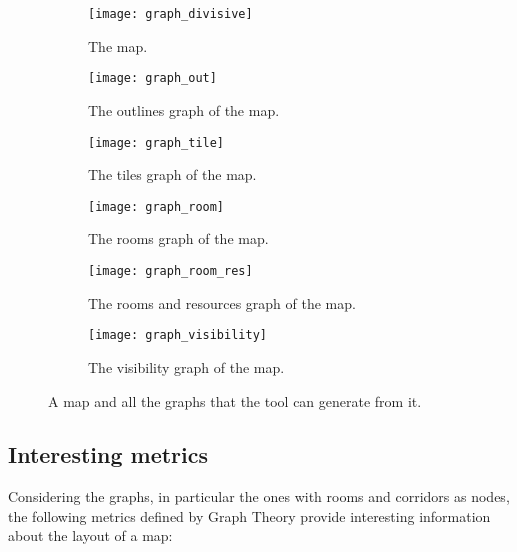 \begin{figure}[]
	\centering
  	\begin{subfigure}[t]{0.45\linewidth}
		\texttt{[image: graph\_divisive]}
     		\caption{The map.}
     		\label{img:graph_divisive}
 	\end{subfigure}
  	\begin{subfigure}[t]{0.45\linewidth}
    		\texttt{[image: graph\_out]}
    		\caption{The outlines graph of the map.}
     		\label{img:graph_out}
  	\end{subfigure}
  	\begin{subfigure}[t]{0.45\linewidth}
    		\texttt{[image: graph\_tile]}
    		\caption{The tiles graph of the map.}
     		\label{img:graph_tile}
  	\end{subfigure}
  	\begin{subfigure}[t]{0.45\linewidth}
    		\texttt{[image: graph\_room]}
    		\caption{The rooms graph of the map.}
     		\label{img:graph_room}
 	\end{subfigure}
  	\begin{subfigure}[t]{0.45\linewidth}
    		\texttt{[image: graph\_room\_res]}
    		\caption{The rooms and resources graph of the map.}
     		\label{img:graph_room_res}
  	\end{subfigure}
  	\begin{subfigure}[t]{0.45\linewidth}
    		\texttt{[image: graph\_visibility]}
    		\caption{The visibility graph of the map.}
     		\label{img:graph_visibility}
  	\end{subfigure}	
	\caption{A map and all the graphs that the tool can generate from it.}
\end{figure}

\subsection{Interesting metrics}

Considering the graphs, in particular the ones with rooms and corridors as nodes, the following metrics defined by Graph Theory provide interesting information about the layout of a map:

